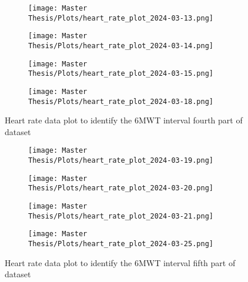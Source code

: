 \FloatBarrier
\begin{figure}[h!]
  \centering
  \begin{subfigure}{.55\textwidth}
    \centering
    \texttt{[image: Master Thesis/Plots/heart\_rate\_plot\_2024-03-13.png]}
    \caption{}
    \label{fig:test12}
  \end{subfigure}%
  \begin{subfigure}{.55\textwidth}
    \centering
    \texttt{[image: Master Thesis/Plots/heart\_rate\_plot\_2024-03-14.png]}
    \caption{}
    \label{fig:test13}
  \end{subfigure}
  \newline
  \begin{subfigure}{.55\textwidth}
    \centering
    \texttt{[image: Master Thesis/Plots/heart\_rate\_plot\_2024-03-15.png]}
    \caption{}
    \label{fig:test14}
  \end{subfigure}%
  \begin{subfigure}{.55\textwidth}
    \centering
    \texttt{[image: Master Thesis/Plots/heart\_rate\_plot\_2024-03-18.png]}
    \caption{}
    \label{fig:test15}
  \end{subfigure}
  \caption{Heart rate data plot to identify the 6MWT interval fourth part of dataset}
  \label{fig:allintervall6mwt4}
\end{figure}
\FloatBarrier

\FloatBarrier
\begin{figure}[h!]
  \centering
  \begin{subfigure}{.55\textwidth}
    \centering
    \texttt{[image: Master Thesis/Plots/heart\_rate\_plot\_2024-03-19.png]}
    \caption{}
    \label{fig:test16}
  \end{subfigure}%
  \begin{subfigure}{.55\textwidth}
    \centering
    \texttt{[image: Master Thesis/Plots/heart\_rate\_plot\_2024-03-20.png]}
    \caption{}
    \label{fig:test17}
  \end{subfigure}
  \newline
  \begin{subfigure}{.55\textwidth}
    \centering
    \texttt{[image: Master Thesis/Plots/heart\_rate\_plot\_2024-03-21.png]}
    \caption{}
    \label{ig:test18}
  \end{subfigure}%
  \begin{subfigure}{.55\textwidth}
    \centering
    \texttt{[image: Master Thesis/Plots/heart\_rate\_plot\_2024-03-25.png]}
    \caption{}
    \label{fig:test19}
  \end{subfigure}
  \caption{Heart rate data plot to identify the 6MWT interval fifth part of dataset}
  \label{fig:allintervall6mwt5}
\end{figure}
\FloatBarrier

